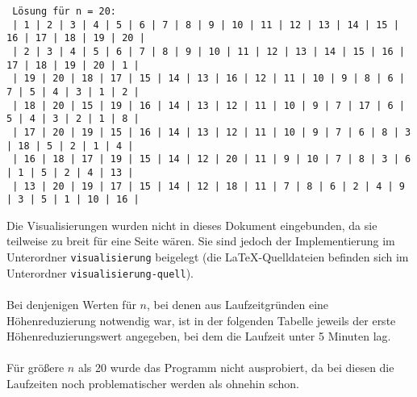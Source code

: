 \documentclass[a4paper, notitlepage, 12pt]{scrartcl}
\begin{document}
\begin{center}
\begin{Verbatim}
 Lösung für n = 20: 
 | 1 | 2 | 3 | 4 | 5 | 6 | 7 | 8 | 9 | 10 | 11 | 12 | 13 | 14 | 15 | 16 | 17 | 18 | 19 | 20 | 
 | 2 | 3 | 4 | 5 | 6 | 7 | 8 | 9 | 10 | 11 | 12 | 13 | 14 | 15 | 16 | 17 | 18 | 19 | 20 | 1 | 
 | 19 | 20 | 18 | 17 | 15 | 14 | 13 | 16 | 12 | 11 | 10 | 9 | 8 | 6 | 7 | 5 | 4 | 3 | 1 | 2 | 
 | 18 | 20 | 15 | 19 | 16 | 14 | 13 | 12 | 11 | 10 | 9 | 7 | 17 | 6 | 5 | 4 | 3 | 2 | 1 | 8 | 
 | 17 | 20 | 19 | 15 | 16 | 14 | 13 | 12 | 11 | 10 | 9 | 7 | 6 | 8 | 3 | 18 | 5 | 2 | 1 | 4 | 
 | 16 | 18 | 17 | 19 | 15 | 14 | 12 | 20 | 11 | 9 | 10 | 7 | 8 | 3 | 6 | 1 | 5 | 2 | 4 | 13 | 
 | 13 | 20 | 19 | 17 | 15 | 14 | 12 | 18 | 11 | 7 | 8 | 6 | 2 | 4 | 9 | 3 | 5 | 1 | 10 | 16 |   
 \end{Verbatim}
 \end{center}
 Die Visualisierungen wurden nicht in dieses Dokument eingebunden, da sie teilweise zu breit für eine Seite wären. Sie sind jedoch der Implementierung im Unterordner \texttt{visualisierung} beigelegt (die LaTeX-Quelldateien befinden sich im Unterordner \texttt{visualisierung-quell}). \\ \\
 Bei denjenigen Werten für $n$, bei denen  aus Laufzeitgründen eine Höhenreduzierung notwendig war, ist in der folgenden Tabelle jeweils der erste Höhenreduzierungswert angegeben, bei dem die Laufzeit unter 5 Minuten lag. \\ \\
Für größere $n$ als 20 wurde das Programm nicht ausprobiert, da bei diesen die Laufzeiten noch problematischer werden als ohnehin schon.
\end{document}
